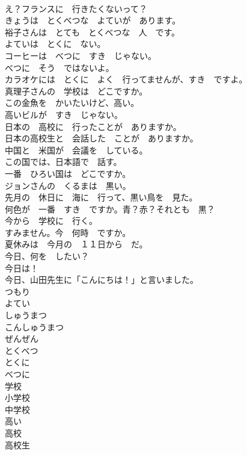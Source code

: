 \documentclass[8pt]{extreport}
\begin{document}
\begin{CJK}{UTF8}{min}
\\	え？フランスに　行きたくないって？	
\\	きょうは　とくべつな　よていが　あります。	
\\	裕子さんは　とても　とくべつな　人　です。	
\\	よていは　とくに　ない。	
\\	コーヒーは　べつに　すき　じゃない。	
\\	べつに　そう　ではないよ。	
\\	カラオケには　とくに　よく　行ってませんが、すき　ですよ。	
\\	真理子さんの　学校は　どこですか。	
\\	この金魚を　かいたいけど、高い。	
\\	高いビルが　すき　じゃない。	
\\	日本の　高校に　行ったことが　ありますか。	
\\	日本の高校生と　会話した　ことが　ありますか。	
\\	中国と　米国が　会議を　している。	
\\	この国では、日本語で　話す。	
\\	一番　ひろい国は　どこですか。	
\\	ジョンさんの　くるまは　黒い。	
\\	先月の　休日に　海に　行って、黒い鳥を　見た。	
\\	何色が　一番　すき　ですか。青？赤？それとも　黒？	
\\	今から　学校に　行く。	
\\	すみません。今　何時　ですか。	
\\	夏休みは　今月の　１１日から　だ。	
\\	今日、何を　したい？	
\\	今日は！	
\\	今日、山田先生に「こんにちは！」と言いました。	
\\	つもり	
\\	よてい	
\\	しゅうまつ	
\\	こんしゅうまつ	
\\	ぜんぜん	
\\	とくべつ	
\\	とくに	
\\	べつに	
\\	学校	
\\	小学校	
\\	中学校	
\\	高い	
\\	高校	
\\	高校生	

\end{CJK}
\end{document}

